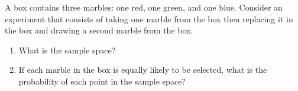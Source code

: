 \documentclass[11pt]{article}
\theoremstyle{definition}
\begin{document}
A box contains three marbles: one red, one green, and one blue. Consider an experiment that consists of taking one marble from the box then replacing it in the box and drawing a second marble from the box.

\begin{enumerate}
	\item What is the sample space?
	\item If each marble in the box is equally likely to be selected, what is the probability of each point in the sample space?
\end{enumerate}
\end{document}
